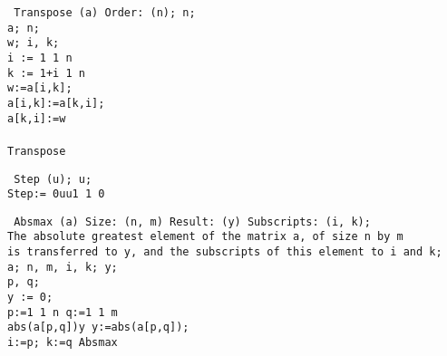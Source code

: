 \documentclass[a4paper,11pt]{article}
\begin{document}
\begin{flushleft}
\texttt{ Transpose (a) Order: (n);  n;\\
 a;  n;\\
  w;  i, k;\\
\hspace{1.25cm} i := 1  1  n \\
\hspace{1.25cm} k := 1+i  1  n \\
\hspace{1.25cm} w:=a[i,k];\\
\hspace{2.50cm}a[i,k]:=a[k,i];\\
\hspace{2.50cm}a[k,i]:=w\\
\hspace{1.25cm}\\
 Transpose\\
}\end{flushleft}

\begin{flushleft}
\texttt{  Step (u);  u;\\
Step:= 0\mle{}u\mland{}u\mle{}1  1  0\\
}\end{flushleft}

\begin{flushleft}
\texttt{ Absmax (a) Size: (n, m) Result: (y) Subscripts: (i, k);\\
 The absolute greatest element of the matrix a, of size n by m\\
is transferred to y, and the subscripts of this element to i and k;\\
 a;  n, m, i, k;  y;\\
  p, q;\\
\hspace{1.25cm}y := 0;\\
\hspace{1.25cm} p:=1  1  n   q:=1  1  m \\
\hspace{1.25cm} abs(a[p,q])\mgt{}y   y:=abs(a[p,q]);\\
\hspace{6.75cm}    i:=p; k:=q   Absmax\\
}\end{flushleft}
\end{document}
